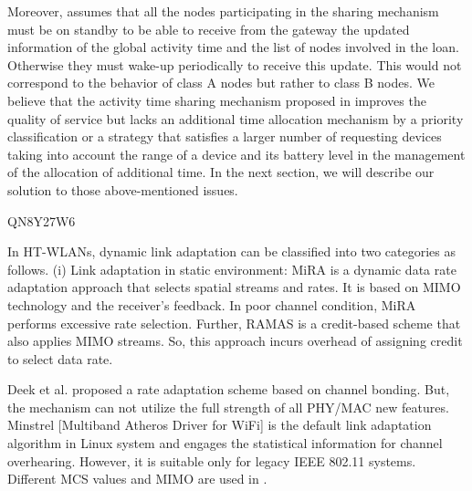 Moreover,
	\cite{pham_qos_2016} assumes that all the nodes participating in the sharing mechanism must be on standby to be able to receive from the gateway the updated information of the global activity time and the list of nodes involved in the loan.
Otherwise they must wake-up periodically to receive this update.
This would not correspond to the behavior of class A nodes but rather to class B nodes.
We believe that the activity time sharing mechanism proposed in \cite{pham_qos_2016} improves the quality of service but lacks an additional time allocation mechanism by a priority classification or a strategy that satisfies a larger number of requesting devices taking into account the range of a device and its battery level in the management of the allocation of additional time.
In the next section,
	we will describe our solution to those above-mentioned issues.

\cite{karmakar_linkcon_2017} QN8Y27W6

In HT-WLANs,
	dynamic link adaptation can be classified into two categories as follows.
(i) Link adaptation in static environment:
	MiRA \cite{pefkianakis_window-based_2013} is a dynamic data rate adaptation approach that selects spatial streams and rates.
It is based on MIMO technology and the receiver’s feedback.
In poor channel condition,
	MiRA performs excessive rate selection.
Further,
	RAMAS \cite{nguyen_practical_2011} is a credit-based scheme that also applies MIMO streams.
So,
	this approach incurs overhead of assigning credit to select data rate.

Deek et al.
\cite{deek_joint_2013} proposed a rate adaptation scheme based on channel bonding.
But,
	the mechanism can not utilize the full strength of all PHY/MAC new features.
Minstrel [Multiband Atheros Driver for WiFi] is the default link adaptation algorithm in Linux system and engages the statistical information for channel overhearing.
However,
	it is suitable only for legacy IEEE 802.11 systems.
Different MCS values and MIMO are used in \cite{das_link_2008} \cite{qiuyan_xia_open-loop_2009}.

